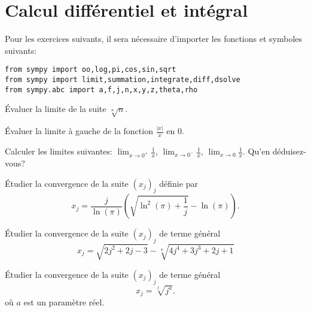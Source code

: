 
\section{Calcul différentiel et intégral}

Pour les exercices suivants, il sera nécessaire d'importer les fonctions
et symboles suivants:
\begin{verbatim}
from sympy import oo,log,pi,cos,sin,sqrt
from sympy import limit,summation,integrate,diff,dsolve
from sympy.abc import a,f,j,n,x,y,z,theta,rho
\end{verbatim}

\begin{exercice}
    Évaluer la limite de la suite $\sqrt[n]{n}$.
\end{exercice}

\begin{exercice}
    Évaluer la limite à gauche de la fonction $\frac{|x|}{x}$ en 0.
\end{exercice}

\begin{exercice}
    Calculer les limites suivantes: 
    $\lim_{x\to0^+}\frac{1}{x}$,\hspace{5pt}
    $\lim_{x\to0^-}\frac{1}{x}$,\hspace{5pt}
    $\lim_{x\to0}\frac{1}{x}$.
    Qu'en déduisez-vous?
\end{exercice}


\begin{exercice}
  \'Etudier la convergence de la suite $(x_j)_j$ d\'efinie par
\[
  x_j = \frac{j}{\ln(\pi)} \left(\sqrt{\ln^2(\pi)+\frac{1}{j}}-
\ln(\pi)\right).
\]
\end{exercice}

\begin{exercice}
Étudier la convergence de la suite $(x_j)_j$ de terme g\'en\'eral
\[
x_j= \sqrt{2 j^2 +2j-3} - \sqrt[4]{4 j^4 + 3j^3 +2 j +1}
\]
\end{exercice}


\begin{exercice}
  Étudier la convergence de la suite $(x_j)_j$ de terme g\'en\'eral
  \[
  x_j=  \sqrt[j]{j^a}.
\]
où $a$ est un paramètre réel.
\end{exercice}

